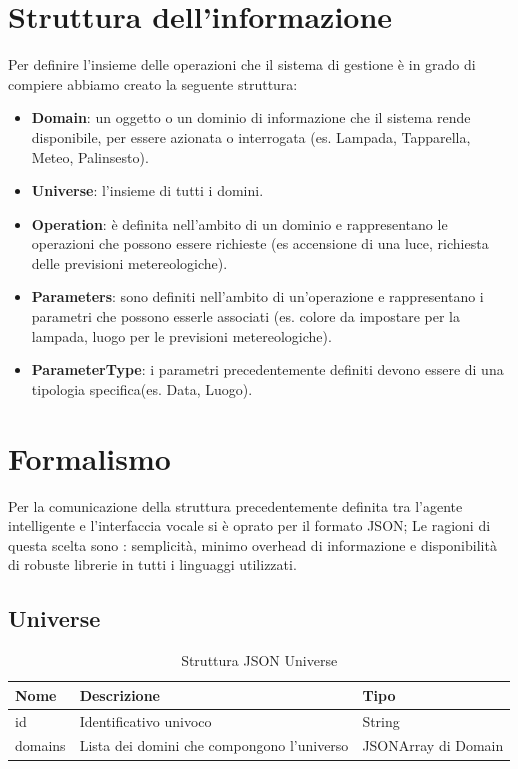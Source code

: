 \documentclass[twoside]{supsistudent}
\begin{document}
\section{Struttura dell'informazione}
Per definire l'insieme delle operazioni che il sistema di gestione è in grado di compiere abbiamo creato la seguente struttura:
\begin{itemize}
	\item \textbf{Domain}: un oggetto o un dominio di informazione che il sistema rende disponibile, per essere azionata o interrogata (es. Lampada, Tapparella, Meteo, Palinsesto).
	\item \textbf{Universe}: l'insieme di tutti i domini.
	\item \textbf{Operation}: è definita nell'ambito di un dominio e rappresentano le operazioni che possono essere richieste (es accensione di una luce, richiesta delle previsioni metereologiche).
	\item \textbf{Parameters}: sono definiti nell'ambito di un'operazione e rappresentano i parametri che possono esserle associati (es. colore da impostare per la lampada, luogo per le previsioni metereologiche).
	\item \textbf{ParameterType}: i parametri precedentemente definiti devono essere di una tipologia specifica(es. Data, Luogo).
\end{itemize}
\section{Formalismo}
Per la comunicazione della struttura precedentemente definita tra l'agente intelligente e l'interfaccia vocale si è oprato per il formato JSON; Le ragioni di questa scelta sono : semplicità,  minimo overhead di informazione e  disponibilità di robuste librerie in tutti i linguaggi utilizzati.

\subsection{Universe}
\begin{table}[H]
\centering
\caption{Struttura JSON Universe}
\label{Struttura JSON Universe}
\begin{tabular}{@{}|l|l|l|@{}}
\toprule
Nome    & Descrizione                                & Tipo                \\ \midrule
id      & Identificativo univoco                     & String             \\ \midrule
domains & Lista dei domini che compongono l'universo & JSONArray di Domain \\ \bottomrule
\end{tabular}
\end{table}
\end{document}
